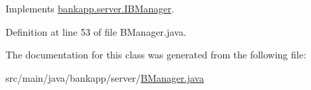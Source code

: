 Implements \hyperlink{interfacebankapp_1_1server_1_1_i_b_manager_a6ed6af471750f7c721d45ead983bef5d}{bankapp.\+server.\+I\+B\+Manager}.



Definition at line 53 of file B\+Manager.\+java.



The documentation for this class was generated from the following file\+:\begin{DoxyCompactItemize}
\item 
src/main/java/bankapp/server/\hyperlink{_b_manager_8java}{B\+Manager.\+java}\end{DoxyCompactItemize}
